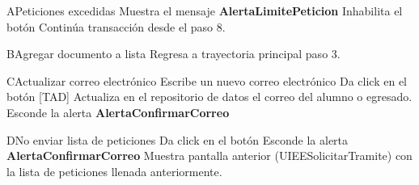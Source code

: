 \begin{UCtrayectoriaA}{A}{Peticiones excedidas} 
\UCpaso Muestra el mensaje {\bf AlertaLimitePeticion}
  \UCpaso Inhabilita el botón  	 
  \UCpaso Continúa transacción desde el paso 8.
\end{UCtrayectoriaA}

\begin{UCtrayectoriaA}{B}{Agregar documento a lista} 
  \UCpaso Regresa a trayectoria principal paso 3.
\end{UCtrayectoriaA}

\begin{UCtrayectoriaA}{C}{Actualizar correo electrónico} 
  \UCpaso[\UCactor] Escribe un nuevo correo electrónico 
  \UCpaso[\UCactor] Da click en el botón  [TAD]
  \UCpaso Actualiza en el repositorio de datos el correo del alumno o egresado.
  \UCpaso Esconde la alerta {\bf AlertaConfirmarCorreo} 
\end{UCtrayectoriaA}

\begin{UCtrayectoriaA}{D}{No enviar lista de peticiones} 
 \UCpaso[\UCactor] Da click en el botón 
 \UCpaso Esconde la alerta  {\bf AlertaConfirmarCorreo} 
 \UCpaso Muestra pantalla anterior (UIEESolicitarTramite) con la lista de peticiones llenada anteriormente.
\end{UCtrayectoriaA}

